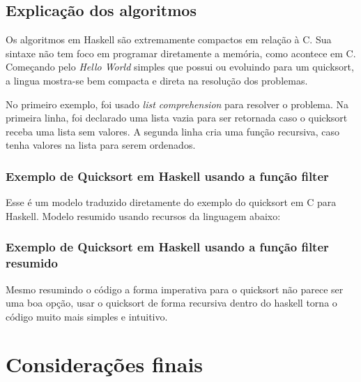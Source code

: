 \documentclass[
  article,			       %
  12pt,				         %
  oneside,			       %
  a4paper,			       %
  english,		       	 %
  brazil,			      	 %
  sumario=tradicional
]{abntex2}
\begin{document}
      \section{Explicação dos algoritmos}
      Os algoritmos em Haskell são extremamente compactos em relação à C. Sua sintaxe não tem foco
      em programar diretamente a memória, como acontece em C. Começando pelo \emph{Hello World} simples que possui ou evoluindo
      para um quicksort, a lingua mostra-se bem compacta e direta na resolução dos problemas.

      No primeiro exemplo, foi usado \emph{list comprehension} para resolver o problema. Na primeira linha,
      foi declarado uma lista vazia para ser retornada caso o quicksort receba uma lista sem valores. A segunda linha
      cria uma função recursiva, caso tenha valores na lista para serem ordenados.

      \subsection{Exemplo de Quicksort em Haskell usando a função filter}

      
      
      Esse é um modelo traduzido diretamente do exemplo do quicksort em C para Haskell. Modelo resumido usando recursos da linguagem
      abaixo:

      \subsection{Exemplo de Quicksort em Haskell usando a função filter resumido} 

      

      Mesmo resumindo o código a forma imperativa para o quicksort não parece ser uma boa opção, usar o quicksort de forma recursiva
      dentro do haskell torna o código muito mais simples e intuitivo.

    \newpage

    \chapter{Considerações finais}

    \newpage

    \postextual
\end{document}

